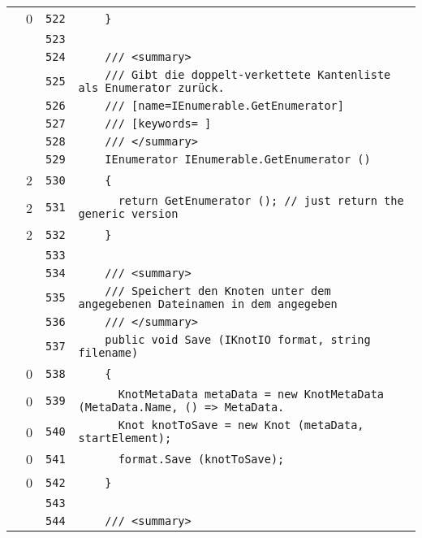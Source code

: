 \documentclass[a4paper,10pt]{article}
\begin{document}
\begin{longtable}[l]{lrrl}
\cellcolor{red} & 0 & \verb~522~ & \verb~    }~\\
\cellcolor{gray} &  & \verb~523~ & \verb~~\\
\cellcolor{gray} &  & \verb~524~ & \verb~    /// <summary>~\\
\cellcolor{gray} &  & \verb~525~ & \verb~    /// Gibt die doppelt-verkettete Kantenliste als Enumerator zurück.~\\
\cellcolor{gray} &  & \verb~526~ & \verb~    /// [name=IEnumerable.GetEnumerator]~\\
\cellcolor{gray} &  & \verb~527~ & \verb~    /// [keywords= ]~\\
\cellcolor{gray} &  & \verb~528~ & \verb~    /// </summary>~\\
\cellcolor{gray} &  & \verb~529~ & \verb~    IEnumerator IEnumerable.GetEnumerator ()~\\
\cellcolor{green} & 2 & \verb~530~ & \verb~    {~\\
\cellcolor{green} & 2 & \verb~531~ & \verb~      return GetEnumerator (); // just return the generic version~\\
\cellcolor{green} & 2 & \verb~532~ & \verb~    }~\\
\cellcolor{gray} &  & \verb~533~ & \verb~~\\
\cellcolor{gray} &  & \verb~534~ & \verb~    /// <summary>~\\
\cellcolor{gray} &  & \verb~535~ & \verb~    /// Speichert den Knoten unter dem angegebenen Dateinamen in dem angegeben~\\
\cellcolor{gray} &  & \verb~536~ & \verb~    /// </summary>~\\
\cellcolor{gray} &  & \verb~537~ & \verb~    public void Save (IKnotIO format, string filename)~\\
\cellcolor{red} & 0 & \verb~538~ & \verb~    {~\\
\cellcolor{red} & 0 & \verb~539~ & \verb~      KnotMetaData metaData = new KnotMetaData (MetaData.Name, () => MetaData.~\\
\cellcolor{red} & 0 & \verb~540~ & \verb~      Knot knotToSave = new Knot (metaData, startElement);~\\
\cellcolor{red} & 0 & \verb~541~ & \verb~      format.Save (knotToSave);~\\
\cellcolor{red} & 0 & \verb~542~ & \verb~    }~\\
\cellcolor{gray} &  & \verb~543~ & \verb~~\\
\cellcolor{gray} &  & \verb~544~ & \verb~    /// <summary>~\\

\end{longtable}
\end{document}
